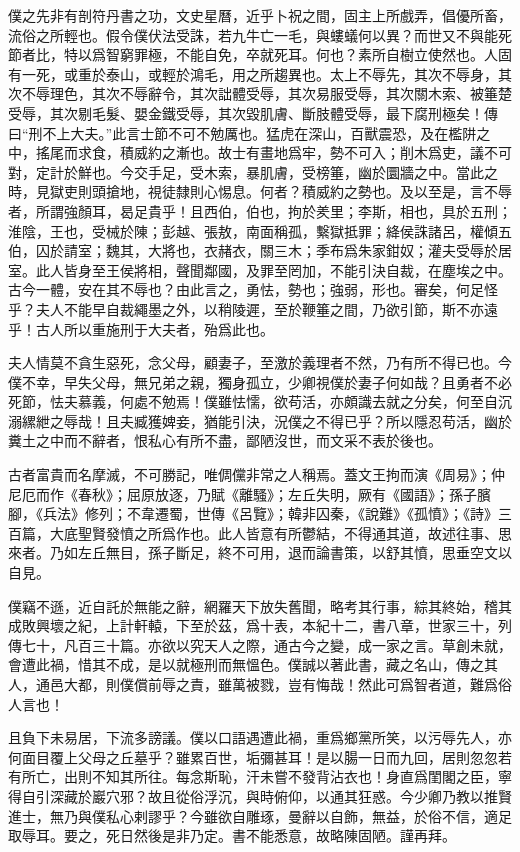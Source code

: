 \documentclass[12pt,a4paper]{ctexbook}
\begin{document}
僕之先非有剖符丹書之功，文史星曆，近乎卜祝之間，固主上所戲弄，倡優所畜，流俗之所輕也。假令僕伏法受誅，若九牛亡一毛，與螻蟻何以異？而世又不與能死節者比，特以爲智窮罪極，不能自免，卒就死耳。何也？素所自樹立使然也。人固有一死，或重於泰山，或輕於鴻毛，用之所趨異也。太上不辱先，其次不辱身，其次不辱理色，其次不辱辭令，其次詘體受辱，其次易服受辱，其次關木索、被箠楚受辱，其次剔毛髮、嬰金鐵受辱，其次毀肌膚、斷肢體受辱，最下腐刑極矣！傳曰“刑不上大夫。”此言士節不可不勉厲也。猛虎在深山，百獸震恐，及在檻阱之中，搖尾而求食，積威約之漸也。故士有畫地爲牢，勢不可入；削木爲吏，議不可對，定計於鮮也。今交手足，受木索，暴肌膚，受榜箠，幽於圜牆之中。當此之時，見獄吏則頭搶地，視徒隸則心惕息。何者？積威約之勢也。及以至是，言不辱者，所謂強顏耳，曷足貴乎！且西伯，伯也，拘於羑里；李斯，相也，具於五刑；淮陰，王也，受械於陳；彭越、張敖，南面稱孤，繫獄抵罪；絳侯誅諸呂，權傾五伯，囚於請室；魏其，大將也，衣赭衣，關三木；季布爲朱家鉗奴；灌夫受辱於居室。此人皆身至王侯將相，聲聞鄰國，及罪至罔加，不能引決自裁，在塵埃之中。古今一體，安在其不辱也？由此言之，勇怯，勢也；強弱，形也。審矣，何足怪乎？夫人不能早自裁繩墨之外，以稍陵遲，至於鞭箠之間，乃欲引節，斯不亦遠乎！古人所以重施刑于大夫者，殆爲此也。\par
夫人情莫不貪生惡死，念父母，顧妻子，至激於義理者不然，乃有所不得已也。今僕不幸，早失父母，無兄弟之親，獨身孤立，少卿視僕於妻子何如哉？且勇者不必死節，怯夫慕義，何處不勉焉！僕雖怯懦，欲苟活，亦頗識去就之分矣，何至自沉溺縲紲之辱哉！且夫臧獲婢妾，猶能引決，況僕之不得已乎？所以隱忍苟活，幽於糞土之中而不辭者，恨私心有所不盡，鄙陋沒世，而文采不表於後也。\par
古者富貴而名摩滅，不可勝記，唯倜儻非常之人稱焉。蓋文王拘而演《周易》；仲尼厄而作《春秋》；屈原放逐，乃賦《離騷》；左丘失明，厥有《國語》；孫子臏腳，《兵法》修列；不韋遷蜀，世傳《呂覽》；韓非囚秦，《說難》《孤憤》；《詩》三百篇，大底聖賢發憤之所爲作也。此人皆意有所鬱結，不得通其道，故述往事、思來者。乃如左丘無目，孫子斷足，終不可用，退而論書策，以舒其憤，思垂空文以自見。\par
僕竊不遜，近自託於無能之辭，網羅天下放失舊聞，略考其行事，綜其終始，稽其成敗興壞之紀，上計軒轅，下至於茲，爲十表，本紀十二，書八章，世家三十，列傳七十，凡百三十篇。亦欲以究天人之際，通古今之變，成一家之言。草創未就，會遭此禍，惜其不成，是以就極刑而無慍色。僕誠以著此書，藏之名山，傳之其人，通邑大都，則僕償前辱之責，雖萬被戮，豈有悔哉！然此可爲智者道，難爲俗人言也！\par
且負下未易居，下流多謗議。僕以口語遇遭此禍，重爲鄉黨所笑，以污辱先人，亦何面目覆上父母之丘墓乎？雖累百世，垢彌甚耳！是以腸一日而九回，居則忽忽若有所亡，出則不知其所往。每念斯恥，汗未嘗不發背沾衣也！身直爲閨閣之臣，寧得自引深藏於巖穴邪？故且從俗浮沉，與時俯仰，以通其狂惑。今少卿乃教以推賢進士，無乃與僕私心剌謬乎？今雖欲自雕琢，曼辭以自飾，無益，於俗不信，適足取辱耳。要之，死日然後是非乃定。書不能悉意，故略陳固陋。謹再拜。\par
\end{document}
